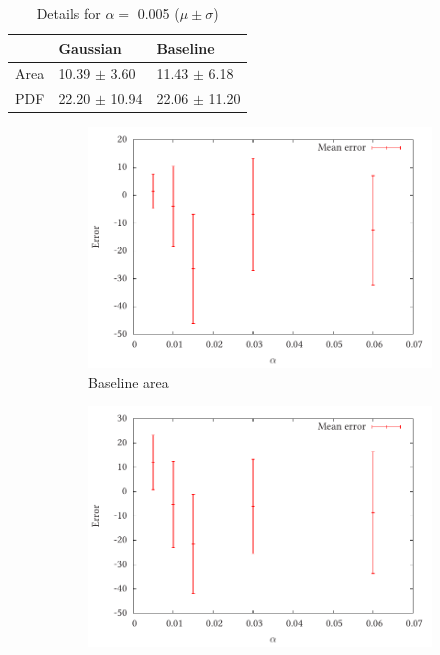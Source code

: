 \documentclass[a4paper,11pt]{article}
\begin{document}
\begin{table}[htb]
\caption{Details for $\alpha=$ 0.005 ($\mu\pm\sigma$)} \label{fig:pretab}
\begin{center}
\begin{tabular}{l|ll}
       &  Gaussian           &  Baseline           \\
\hline
 Area  &  10.39 $\pm$ 3.60   &  11.43 $\pm$ 6.18   \\
 PDF   &  22.20 $\pm$ 10.94  &  22.06 $\pm$ 11.20  \\
\end{tabular}
\end{center}
\end{table}


\begin{center}
\begin{figure}
\begin{subfigure}{0.5\textwidth}
\includegraphics[width=\textwidth]{base_area_prelim}
\caption{Baseline area}
\end{subfigure}
\begin{subfigure}{0.5\textwidth}
\includegraphics[width=\textwidth]{base_pmf_prelim}

\end{subfigure}
\end{figure}
\end{center}
\end{document}
